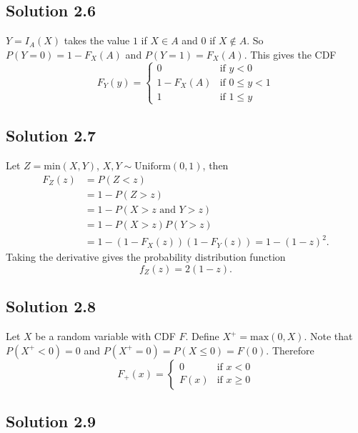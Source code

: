 \subsection*{Solution 2.6}

$Y = I_A(X)$ takes the value $1$ if $X \in A$ and $0$ if $X \notin A$.
So $P(Y = 0) = 1 - F_X(A)$ and $P(Y = 1) = F_X(A)$.
This gives the CDF
$$
F_Y(y) = \left\{ \begin{array}{ll}
    0 & \text{if } y < 0 \\
    1 - F_X(A) & \text{if } 0 \leq y < 1 \\
    1 & \text{if } 1 \leq y
\end{array} \right.
$$


\subsection*{Solution 2.7}

Let $Z = \mathrm{min}(X, Y)$, $X, Y \sim \mathrm{Uniform}(0, 1)$, then
\begin{equation*}
\begin{split}
F_Z(z) &= P(Z < z) \\
    &= 1 - P(Z > z) \\
    &= 1 - P(X > z \text{ and } Y > z) \\
    &= 1 - P(X > z)P(Y > z) \\
    &= 1 -(1 - F_X(z))(1 - F_Y(z))
    = 1 - (1 - z)^2.
\end{split}
\end{equation*}
Taking the derivative gives the probability distribution function
$$
f_Z(z) = 2 (1 - z).
$$


\subsection*{Solution 2.8}

Let $X$ be a random variable with CDF $F$.
Define $X^+ = \mathrm{max}(0, X)$.
Note that $P(X^+ < 0) = 0$ and $P(X^+ = 0) = P(X \leq 0) = F(0)$.
Therefore
\begin{equation*}
    F_+(x) = \left\{ \begin{array}{ll}
        0 & \text{if } x < 0 \\
        F(x) & \text{if } x \geq 0
    \end{array} \right.
\end{equation*}


\subsection*{Solution 2.9}

